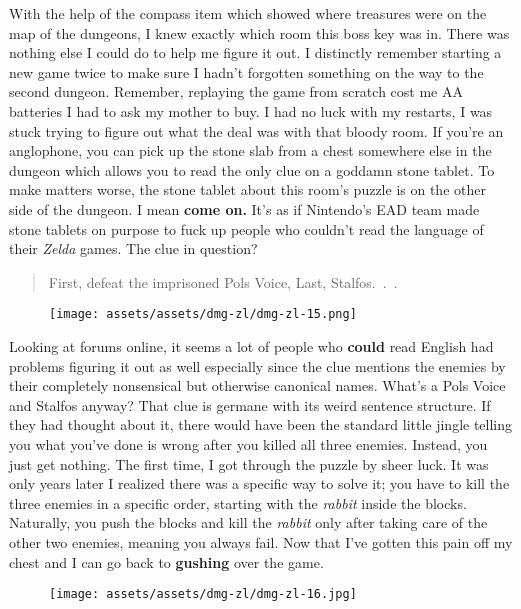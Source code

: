 \documentclass{book}
\begin{document}
With the help of the compass item which showed where treasures were on the map of the dungeons, I knew exactly which room this boss key was in. There was nothing else I could do to help me figure it out. I distinctly remember starting a new game twice to make sure I hadn’t forgotten something on the way to the second dungeon. Remember, replaying the game from scratch cost me AA batteries I had to ask my mother to buy. I had no luck with my restarts, I was stuck trying to figure out what the deal was with that bloody room. If you’re an anglophone, you can pick up the stone slab from a chest somewhere else in the dungeon which allows you to read the only clue on a goddamn stone tablet. To make matters worse, the stone tablet about this room’s puzzle is on the other side of the dungeon. I mean \textbf{come on.} It’s as if Nintendo’s EAD team made stone tablets on purpose to fuck up people who couldn’t read the language of their \emph{Zelda} games. The clue in question?

\begin{quote}
First, defeat the imprisoned Pols Voice, Last, Stalfos. . .
\end{quote} \par

\begin{figure}[hbt]
\vskip 10pt
\centering \texttt{[image: assets/assets/dmg-zl/dmg-zl-15.png]}
\vskip 6pt
\end{figure}

Looking at forums online, it seems a lot of people who \textbf{could} read English had problems figuring it out as well especially since the clue mentions the enemies by their completely nonsensical but otherwise canonical names. What’s a Pols Voice and Stalfos anyway? That clue is germane with its weird sentence structure. If they had thought about it, there would have been the standard little jingle telling you what you’ve done is wrong after you killed all three enemies. Instead, you just get nothing. The first time, I got through the puzzle by sheer luck. It was only years later I realized there was a specific way to solve it; you have to kill the three enemies in a specific order, starting with the \emph{rabbit} inside the blocks. Naturally, you push the blocks and kill the \emph{rabbit} only after taking care of the other two enemies, meaning you always fail. Now that I’ve gotten this pain off my chest and I can go back to \textbf{gushing} over the game.

\begin{figure}[hbt]
\vskip 10pt
\centering \texttt{[image: assets/assets/dmg-zl/dmg-zl-16.jpg]}
\vskip 6pt
\end{figure}
\end{document}
